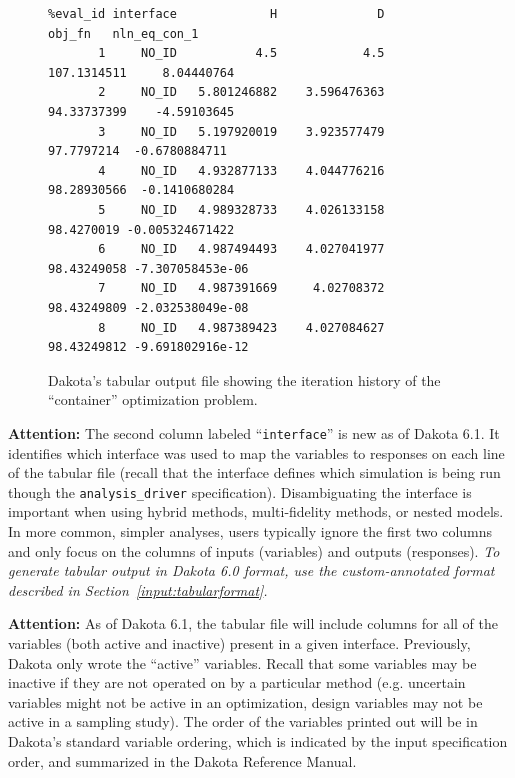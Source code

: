 \begin{figure}
\begin{bigbox}
\begin{small}
\begin{verbatim}
%eval_id interface             H              D         obj_fn   nln_eq_con_1 
       1     NO_ID           4.5            4.5    107.1314511     8.04440764 
       2     NO_ID   5.801246882    3.596476363    94.33737399    -4.59103645 
       3     NO_ID   5.197920019    3.923577479     97.7797214  -0.6780884711 
       4     NO_ID   4.932877133    4.044776216    98.28930566  -0.1410680284 
       5     NO_ID   4.989328733    4.026133158     98.4270019 -0.005324671422 
       6     NO_ID   4.987494493    4.027041977    98.43249058 -7.307058453e-06 
       7     NO_ID   4.987391669     4.02708372    98.43249809 -2.032538049e-08 
       8     NO_ID   4.987389423    4.027084627    98.43249812 -9.691802916e-12 
\end{verbatim}
\end{small}
\end{bigbox}
\caption{Dakota's tabular output file showing the iteration history of
the ``container'' optimization problem.} \label{output:tabcont}
\end{figure}

{\bf Attention:} The second column labeled ``\texttt{interface}'' is
new as of Dakota 6.1.  It identifies which interface was used to map
the variables to responses on each line of the tabular file (recall
that the interface defines which simulation is being run though the
\texttt{analysis\_driver} specification).  Disambiguating the
interface is important when using hybrid methods, multi-fidelity
methods, or nested models.  In more common, simpler analyses, users
typically ignore the first two columns and only focus on the columns
of inputs (variables) and outputs (responses).  \emph{To generate tabular
output in Dakota 6.0 format, use the custom-annotated format described
in Section~\ref{input:tabularformat}.}

{\bf Attention:} As of Dakota 6.1, the tabular file will include
columns for all of the variables (both active and inactive) present in
a given interface.  Previously, Dakota only wrote the ``active''
variables.  Recall that some variables may be inactive if they are not
operated on by a particular method (e.g. uncertain variables might not
be active in an optimization, design variables may not be active in a
sampling study).  The order of the variables printed out will be in
Dakota's standard variable ordering, which is indicated by the input
specification order, and summarized in the Dakota Reference Manual.

